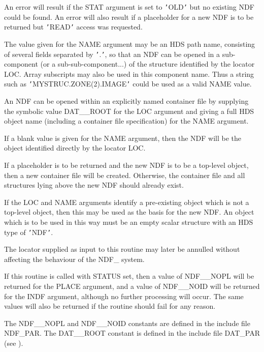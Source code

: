 \documentclass[twoside,11pt,nolof]{starlink}
\providecommand{\hi}[1]{{\texttt{#1}}}
\begin{document}
{{{         \sstitem
         An error will result if the STAT argument is set to \hi{'}OLD\hi{'} but
         no existing NDF could be found. An error will also result if a
         placeholder for a new NDF is to be returned but \hi{'}READ\hi{'} access was
         requested.

         \sstitem
         The value given for the NAME argument may be an HDS path name,
         consisting of several fields separated by \hi{'}.\hi{'}, so that an NDF can
         be opened in a sub-component (or a sub-sub-component...) of the
         structure identified by the locator LOC.  Array subscripts may
         also be used in this component name.  Thus a string such as
         \hi{'}MYSTRUC.ZONE(2).IMAGE\hi{'} could be used as a valid NAME value.

         \sstitem
         An NDF can be opened within an explicitly named container file
         by supplying the symbolic value DAT\_\_ROOT for the LOC argument
         and giving a full HDS object name (including a container file
         specification) for the NAME argument.

         \sstitem
         If a blank value is given for the NAME argument, then the
         NDF will be the object identified directly by the locator LOC.

         \sstitem
         If a placeholder is to be returned and the new NDF is to be a
         top-level object, then a new container file will be created.
         Otherwise, the container file and all structures lying above the
         new NDF should already exist.

         \sstitem
         If the LOC and NAME arguments identify a pre-existing object
         which is not a top-level object, then this may be used as the
         basis for the new NDF. An object which is to be used in this way
         must be an empty scalar structure with an HDS type of \hi{'}NDF\hi{'}.

         \sstitem
         The locator supplied as input to this routine may later be
         annulled without affecting the behaviour of the NDF\_ system.

         \sstitem
         If this routine is called with STATUS set, then a value of
         NDF\_\_NOPL will be returned for the PLACE argument, and a value of
         NDF\_\_NOID will be returned for the INDF argument, although no
         further processing will occur. The same values will also be
         returned if the routine should fail for any reason.

         \sstitem
         The NDF\_\_NOPL and NDF\_\_NOID constants are defined in the
         include file NDF\_PAR. The DAT\_\_ROOT constant is defined in the
         include file DAT\_PAR (see ).
      }
   }
}
\end{document}
